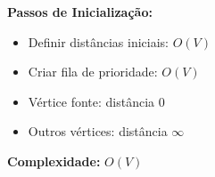 \documentclass[preview]{standalone}
\begin{document}
\begin{center}
\textbf{Passos de Inicialização:}
            \begin{itemize}
                \item Definir distâncias iniciais: $O(V)$
                \item Criar fila de prioridade: $O(V)$
                \item Vértice fonte: distância $0$
                \item Outros vértices: distância $\infty$
            \end{itemize}
            
            \textbf{Complexidade:} $O(V)$
\end{center}
\end{document}
